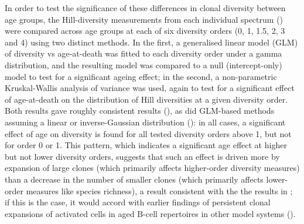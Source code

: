 In order to test the significance of these differences in clonal diversity between age groups, the Hill-diversity measurements from each individual spectrum () were compared across age groups at each of six diversity orders (0, 1, 1.5, 2, 3 and 4) using two distinct methods. In the first, a generalised linear model (GLM) of diversity vs age-at-death was fitted to each diversity order under a gamma distribution, and the resulting model was compared to a null (intercept-only) model to test for a significant ageing effect; in the second, a non-parametric Kruskal-Wallis analysis of variance was used, again to test for a significant effect of age-at-death on the distribution of Hill diversities at a given diversity order. Both results gave roughly consistent results (), as did GLM-based methods assuming a linear or inverse-Gaussian distribution (): in all cases, a significant effect of age on diversity is found for all tested diversity orders above 1, but not for order 0 or 1. This pattern, which indicates a significant age effect at higher but not lower diversity orders, suggests that such an effect is driven more by expansion of large clones (which primarily affects higher-order diversity measures) than a decrease in the number of smaller clones (which primarily affects lower-order measures like species richness), a result consistent with the the results in ; if this is the case, it would accord with earlier findings of persistent clonal expansions of activated cells in aged B-cell repertoires in other model systems ().

